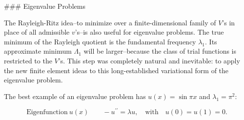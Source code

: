 ### Eigenvalue Problems

The Rayleigh-Ritz idea--to minimize over a finite-dimensional family of \(V\)'s in place of all admissible \(v\)'s--is also useful for eigenvalue problems. The true minimum of the Rayleigh quotient is the fundamental frequency \(\lambda_{1}\). Its approximate minimum \(\Lambda_{1}\) will be larger--because the class of trial functions is restricted to the \(V\)'s. This step was completely natural and inevitable: to apply the new finite element ideas to this long-established variational form of the eigenvalue problem.

The best example of an eigenvalue problem has \(u(x)=\sin\pi x\) and \(\lambda_{1}=\pi^{2}\):

\[\text{{Eigenfunction}}\ u(x)\qquad-u^{\prime\prime}=\lambda u,\quad\text{with} \quad u(0)=u(1)=0.\] 